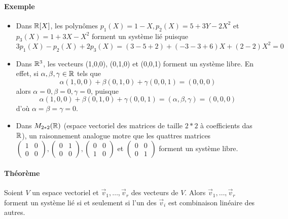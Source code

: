 \paragraph{Exemple}\begin{itemize}
	\item Dans $\mathbb{R}[X]$, les polynômes $p_1(X)=1-X, p_2(X)=5+3Y-2X^2$ et $ p_3(X)=1+3X-X^2$ forment un système lié puisque $$3p_1(X)-p_2(X)+2p_3(X)=(3-5+2)+(-3-3+6)X+(2-2)X^2=0$$
	\item Dans $\mathbb{R}^3$, les vecteurs (1,0,0), (0,1,0) et (0,0,1) forment un système libre. En effet, si $\alpha, \beta, \gamma \in \mathbb{R}$ tels que $$\alpha(1,0,0)+ \beta(0,1,0)+ \gamma(0,0,1)=(0,0,0)$$ alors $\alpha=0,\beta=0,\gamma=0$, puisque $$\alpha(1,0,0)+ \beta(0,1,0)+ \gamma(0,0,1)=(\alpha,\beta,\gamma)=(0,0,0)$$ d'où $\alpha=\beta=\gamma=0$.
	\item Dans $M_{2*2}(\mathbb{R})$ (espace vectoriel des matrices de taille $2*2$ à coefficients das $\mathbb{R}$), un raisonnement analogue motre que les quattres matrices $\begin{pmatrix}1&0\\0&0\end{pmatrix}, \begin{pmatrix}0&1\\0&0\end{pmatrix},\begin{pmatrix}0&0\\1&0\end{pmatrix}$ et $ \begin{pmatrix}0&0\\0&1\end{pmatrix}$ forment un système libre.
\end{itemize}

\paragraph{Théorème} Soient $V$ un espace vectoriel et $\vec{v}_1, \ldots, \vec{v}_r$ des vecteurs de $V$. Alors $\vec{v}_1, \ldots, \vec{v}_r$ forment un système lié si et seulement si l'un des $\vec{v}_i$ est combinaison linéaire des autres.
